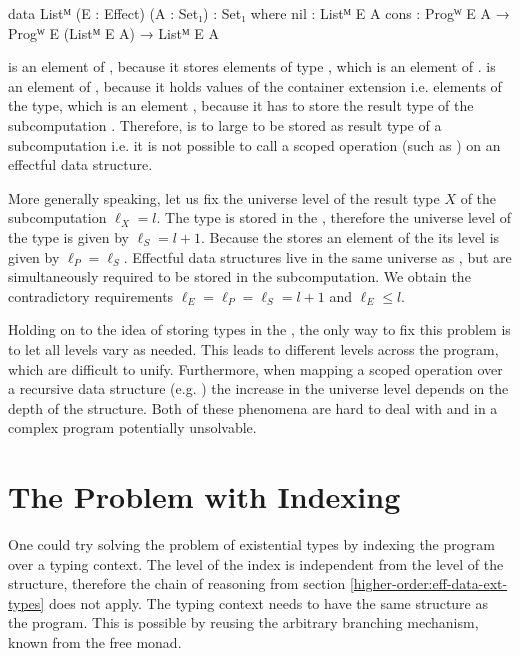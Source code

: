 \begin{code}
data Listᴹ (E : Effect) (A : Set₁) : Set₁ where
  nil   : Listᴹ E A
  cons  : Progᵂ E A → Progᵂ E (Listᴹ E A) → Listᴹ E A
\end{code}
\AgdaSpace{}\AgdaSpace{} is
an element of , because it stores elements of type
\AgdaSpace{}\AgdaSpace{},
which is an element of .
\AgdaSpace{}\AgdaSpace{} is
an element of , because it holds values of the container
extension i.e. elements of the  type, which is an element
, because it has to store the result type of the
subcomputation .
Therefore,
\AgdaSpace{}\AgdaSpace{} is
to large to be stored as result type of a subcomputation i.e. it is not possible
to call a scoped operation (such as ) on an effectful data
structure.

More generally speaking, let us fix the universe level of the result type $X$ of
the subcomputation $\ell_X = l$.
The type is stored in the , therefore the universe level of the
 type is given by $\ell_S = l + 1$.
Because the  stores an element of the  its
level is given by $\ell_P = \ell_S$.
Effectful data structures live in the same universe as , but
are simultaneously required to be stored in the subcomputation.
We obtain the contradictory requirements $\ell_E = \ell_P = \ell_S = l + 1$ and
$\ell_E  \leqslant l$.

Holding on to the idea of storing types in the , the only way to
fix this problem is to let all levels vary as needed.
This leads to different levels across the program, which are difficult to unify.
Furthermore, when mapping a scoped operation over a recursive data structure
(e.g. ) the increase in the universe level depends on the
depth of the structure.
Both of these phenomena are hard to deal with and in a complex program
potentially unsolvable.


\section{The Problem with Indexing}

One could try solving the problem of existential types by indexing the program
over a typing context.
The level of the index is independent from the level of the structure, therefore
the chain of reasoning from section \ref{higher-order:eff-data-ext-types} does
not apply.
The typing context needs to have the same structure as the program.
This is possible by reusing the arbitrary branching mechanism, known from the
free monad.

